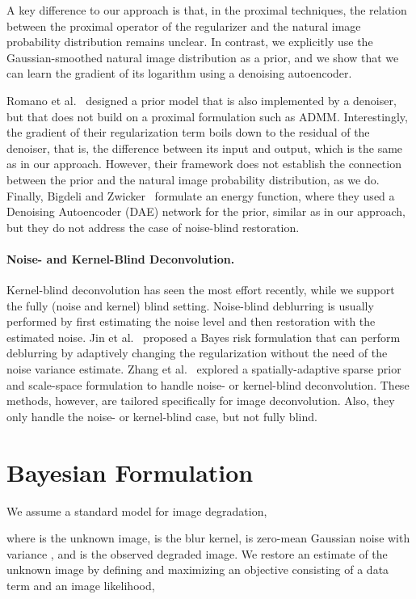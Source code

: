 \documentclass{article}
\begin{document}
A key difference to our approach is that, in the proximal techniques, the relation between the proximal operator of the regularizer and the natural image probability distribution remains unclear. In contrast, we explicitly use the Gaussian-smoothed natural image distribution as a prior, and we show that we can learn the gradient of its logarithm using a denoising autoencoder.

Romano et al.~\cite{romano2016little} designed a prior model that is also implemented by a denoiser, but that does not build on a proximal formulation such as ADMM. Interestingly, the gradient of their regularization term boils down to the residual of the denoiser, that is, the difference between its input and output, which is the same as in our approach. However, their framework does not establish the connection between the prior and the natural image probability distribution, as we do. Finally, Bigdeli and Zwicker~\cite{bigdeli2017image} formulate an energy function, where they used a Denoising Autoencoder (DAE) network for the prior, similar as in our approach, but they do not address the case of noise-blind restoration.


\paragraph{Noise- and Kernel-Blind Deconvolution.}
Kernel-blind deconvolution has seen the most effort recently, while we support the fully (noise and kernel) blind setting.
Noise-blind deblurring is usually performed by first estimating the noise level and then restoration with the estimated noise.
Jin et al.~\cite{Jin:2017:NBD} proposed a Bayes risk formulation that can perform deblurring by adaptively changing the regularization without the need of the noise variance estimate.
Zhang et al.~\cite{NIPS2013_4864, NIPS2014_5566} explored a spatially-adaptive sparse prior and scale-space formulation to handle noise- or kernel-blind deconvolution.
These methods, however, are tailored specifically for image deconvolution. Also, they only handle the noise- or kernel-blind case, but not fully blind.

\section{Bayesian Formulation}

We assume a standard model for image degradation, 

where  is the unknown image,  is the blur kernel,  is zero-mean Gaussian noise with variance , and  is the observed degraded image.  We restore an estimate  of the unknown image by defining and maximizing an objective consisting of a data term and an image likelihood,
\end{document}
